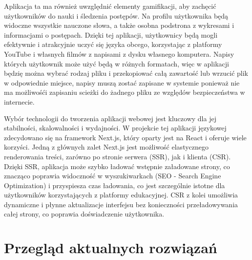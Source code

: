 Aplikacja ta ma również uwzględnić elementy gamifikacji, aby zachęcić użytkowników do nauki i śledzenia postępów. Na profilu użytkownika będą widoczne wszystkie nauczone słowa, a także osobna podstrona z wykresami i informacjami o postępach. Dzięki tej aplikacji, użytkownicy będą mogli efektywnie i atrakcyjnie uczyć się języka obcego, korzystając z platformy YouTube i własnych filmów z napisami z dysku własnego komputera. Napisy których użytkownik może użyć będą w różnych formatach, więc w aplikacji będzię można wybrać rodzaj pliku i przekopiować całą zawartość lub wrzucić plik w odpowiednie miejsce, napisy muszą zostać zapisane w systemie ponieważ nie ma możliwośći zapisaniu scieżki do żadnego pliku ze względów bezpieczeństwa w internecie.

Wybór technologii do tworzenia aplikacji webowej jest kluczowy dla jej stabilności, skalowalności i wydajności. W projekcie tej aplikacji językowej zdecydowano się na framework Next.js, który oparty jest na React i oferuje wiele korzyści. Jedną z głównych zalet Next.js jest możliwość elastycznego renderowania treści, zarówno po stronie serwera (SSR), jak i klienta (CSR). Dzięki SSR, aplikacja może szybko ładować wstępnie załadowane strony, co znacząco poprawia widoczność w wyszukiwarkach (SEO - Search Engine Optimization) i przyspiesza czas ładowania, co jest szczególnie istotne dla użytkowników korzystających z platformy edukacyjnej. CSR z kolei umożliwia dynamiczne i płynne aktualizacje interfejsu bez konieczności przeładowywania całej strony, co poprawia doświadczenie użytkownika.


\section{Przegląd aktualnych rozwiązań}

